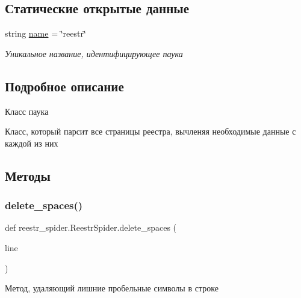 \subsection*{Статические открытые данные}
\begin{DoxyCompactItemize}
\item 
\mbox{\label{classreestr__spider_1_1ReestrSpider_aacc299cb0284b8bed690b8326c7a032e}} 
string \hyperlink{classreestr__spider_1_1ReestrSpider_aacc299cb0284b8bed690b8326c7a032e}{name} = \char`\"{}reestr\char`\"{}
\begin{DoxyCompactList}\small\item\em Уникальное название, идентифицирующее паука \end{DoxyCompactList}\end{DoxyCompactItemize}


\subsection{Подробное описание}
Класс паука 

Класс, который парсит все страницы реестра, вычленяя необходимые данные с каждой из них 

\subsection{Методы}
\mbox{\label{classreestr__spider_1_1ReestrSpider_ac04a7814ce5c2beb13a2ad733cfd49ff}} 
\subsubsection{\texorpdfstring{delete\+\_\+spaces()}{delete\_spaces()}}
{\footnotesize\ttfamily def reestr\+\_\+spider.\+Reestr\+Spider.\+delete\+\_\+spaces (\begin{DoxyParamCaption}\item[{}]{line }\end{DoxyParamCaption})\hspace{0.3cm}{\ttfamily [static]}}



Метод, удаляющий лишние пробельные символы в строке 


